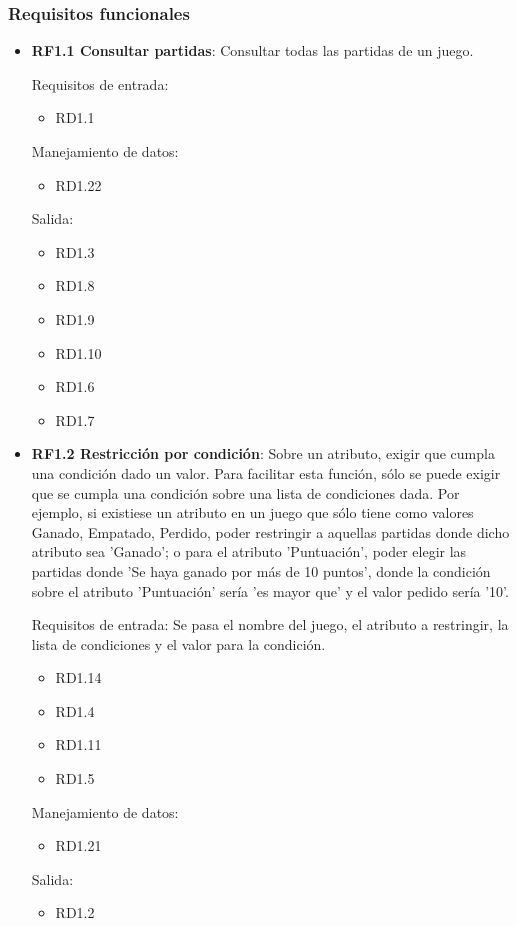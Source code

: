 \subsubsection{Requisitos funcionales}
\begin{itemize}
	\item \textbf{RF1.1 Consultar partidas}: Consultar todas las partidas de un juego.
	
	Requisitos de entrada:
	\begin{itemize}
		\item RD1.1
	\end{itemize}
	Manejamiento de datos:
	\begin{itemize}
		\item RD1.22
	\end{itemize}
	Salida:
	\begin{itemize}
		\item RD1.3
		\item RD1.8
		\item RD1.9
		\item RD1.10
		\item RD1.6
		\item RD1.7
	\end{itemize}
	
	
	\item \textbf{RF1.2 Restricción por condición}: Sobre un atributo, exigir que cumpla una condición dado un valor. Para facilitar esta función, sólo se puede exigir que se cumpla una condición sobre una lista de condiciones dada. Por ejemplo, si existiese un atributo en un juego que sólo tiene como valores {Ganado, Empatado, Perdido}, poder restringir a aquellas partidas donde dicho atributo sea 'Ganado'; o para el atributo 'Puntuación', poder elegir las partidas donde 'Se haya ganado por más de 10 puntos', donde la condición sobre el atributo 'Puntuación' sería 'es mayor que' y el valor pedido sería '10'.
	
	Requisitos de entrada: Se pasa el nombre del juego, el atributo a restringir, la lista de condiciones y el valor para la condición.
	\begin{itemize}
		\item RD1.14
		\item RD1.4
		\item RD1.11
		\item RD1.5
	\end{itemize}
	Manejamiento de datos: 
	\begin{itemize}
		\item RD1.21
	\end{itemize}
	Salida:
	\begin{itemize}
		\item RD1.2
	\end{itemize}
	

\end{itemize}
